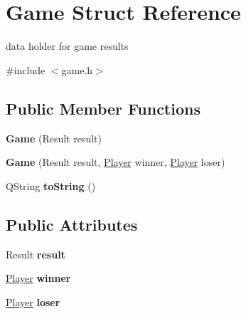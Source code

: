 \hypertarget{structGame}{\section{\-Game \-Struct \-Reference}
\label{structGame}
}


data holder for game results  




{\ttfamily \#include $<$game.\-h$>$}

\subsection*{\-Public \-Member \-Functions}
\begin{DoxyCompactItemize}
\item 
\hypertarget{structGame_a044fef9d8dfbbece3bafa8762991d50a}{{\bfseries \-Game} (\-Result result)}\label{structGame_a044fef9d8dfbbece3bafa8762991d50a}

\item 
\hypertarget{structGame_a5e9801592737721fdaecfb2e7b00cc13}{{\bfseries \-Game} (\-Result result, \hyperlink{classPlayer}{\-Player} winner, \hyperlink{classPlayer}{\-Player} loser)}\label{structGame_a5e9801592737721fdaecfb2e7b00cc13}

\item 
\hypertarget{structGame_a0aa609437b4295dba61e18b7e01cc2a7}{\-Q\-String {\bfseries to\-String} ()}\label{structGame_a0aa609437b4295dba61e18b7e01cc2a7}

\end{DoxyCompactItemize}
\subsection*{\-Public \-Attributes}
\begin{DoxyCompactItemize}
\item 
\hypertarget{structGame_a9649ed9f4a7e37744396a793d345a222}{\-Result {\bfseries result}}\label{structGame_a9649ed9f4a7e37744396a793d345a222}

\item 
\hypertarget{structGame_a590df81200f797fd5bef8c5968a2ea1b}{\hyperlink{classPlayer}{\-Player} {\bfseries winner}}\label{structGame_a590df81200f797fd5bef8c5968a2ea1b}

\item 
\hypertarget{structGame_a151b35fd4e46d2152eb7e5d196e0b4de}{\hyperlink{classPlayer}{\-Player} {\bfseries loser}}\label{structGame_a151b35fd4e46d2152eb7e5d196e0b4de}

\end{DoxyCompactItemize}


